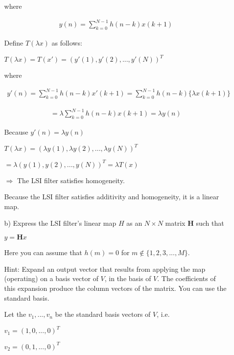 \documentclass[fleqn]{article}
\begin{document}
\begin{enumerate}[nolistsep]
\begin{enumerate}
				where
				
				\begin{align*}
					y(n) = \sum_{k=0}^{N-1}{h(n-k)x(k+1)}
				\end{align*}
				
				Define $T(\lambda x)$ as follows:
				
				$T(\lambda x) = T(x') = (y'(1), y'(2), ..., y'(N))^T$
				
				where
				
				\begin{align*}
					y'(n) = \sum_{k=0}^{N-1}{h(n-k)x'(k+1)} = \sum_{k=0}^{N-1}{h(n-k)\{\lambda x(k+1)\}}
				\end{align*}
				
				\vspace{-12pt}
				
				\begin{align*}
					= \lambda\sum_{k=0}^{N-1}{h(n-k)x(k+1)} = \lambda y(n)
				\end{align*}
				
				Because $y'(n) = \lambda y(n)$
				
				$T(\lambda x) = (\lambda y(1), \lambda y(2), ..., \lambda y(N))^T$
				
				$= \lambda(y(1), y(2), ..., y(N))^T = \lambda T(x)$
				
				$\Rightarrow$ The LSI filter satisfies homogeneity.
				
				Because the LSI filter satisfies additivity and homogeneity, it is a linear map.
			
			\item[b)] Express the LSI filter's linear map $H$ as an $N \times N$ matrix $\mathbf{H}$ such that
			
			\begin{center}
				$y = \mathbf{H}x$
			\end{center}
			
			Here you can assume that $h(m) = 0$ for $m \not\in \{1,2,3,...,M\}$.
			
			\pagebreak
			Hint: Expand an output vector that results from applying the map (operating) on a basis vector of $V$, in the basis of $V$. The coefficients of this expansion produce the column vectors of the matrix. You can use the standard basis.

			Let the $v_1,...,v_n$ be the standard basis vectors of $V$, i.e.
			
			$v_1 = (1, 0,...,0)^T$
			
			$v_2 = (0, 1,...,0)^T$
			

\end{enumerate}
\end{enumerate}
\end{document}
